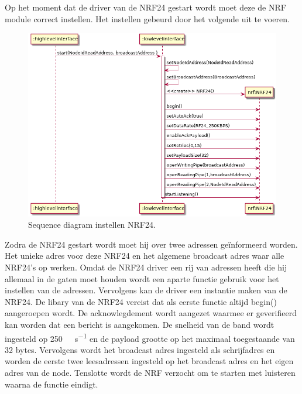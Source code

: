 \documentclass[a4paper, 11pt, oneside]{report}
\begin{document}
Op het moment dat de driver van de NRF24 gestart wordt moet deze de NRF module correct instellen.
Het instellen gebeurd door het volgende uit te voeren.
\begin{figure}[H]
	\begin{center}\includegraphics[width=.9\linewidth]{UML/out/NRF24/sequence/SetupNRF24/SetupNRF24.png}\end{center}
	\caption{Sequence diagram instellen NRF24.}
	\label{fig:NRF24:sequence:SetupNRF24}
\end{figure}

Zodra de NRF24 gestart wordt moet hij over twee adressen geïnformeerd worden.
Het unieke adres voor deze NRF24 en het algemene broadcast adres waar alle NRF24's op werken.
Omdat de NRF24 driver een rij van adressen heeft die hij allemaal in de gaten moet houden wordt een aparte functie gebruik voor het instellen van de adressen.
Vervolgens kan de driver een instantie maken van de NRF24.
De libary van de NRF24 vereist dat als eerste functie altijd begin() aangeroepen wordt.
De acknowlegdement wordt aangezet waarmee er geverifieerd kan worden dat een bericht is aangekomen.
De snelheid van de band wordt ingesteld op \SI{250}{\kilo\bit\per\second}  en de payload grootte op het maximaal toegestaande van 32 bytes.
Vervolgens wordt het broadcast adres ingesteld als schrijfadres en worden de eerste twee leesadressen ingesteld op het broadcast adres en het eigen adres van de node.
Tenslotte wordt de NRF verzocht om te starten met luisteren waarna de functie eindigt.
\end{document}
